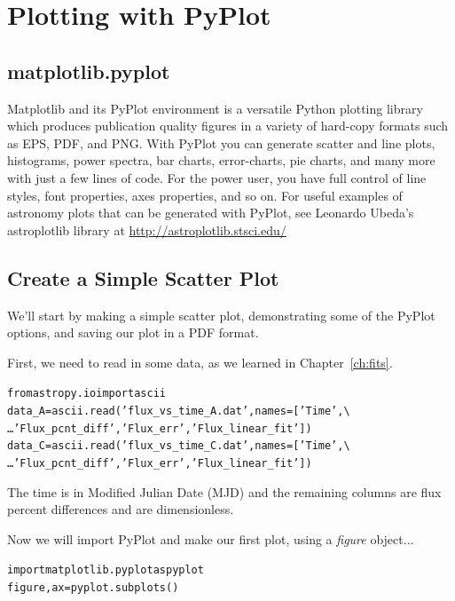 \chapter{Plotting with PyPlot}
\label{ch:pyplot}

\section{matplotlib.pyplot}
Matplotlib and its PyPlot environment is a versatile Python plotting
library which produces publication quality figures in a variety of
hard-copy formats such as EPS, PDF, and PNG.  With PyPlot you can
generate scatter and line plots, histograms, power spectra, bar
charts, error-charts, pie charts, and many more with just a few lines
of code. For the power user, you have full control of line styles,
font properties, axes properties, and so on. For useful examples of 
astronomy plots that can be generated with PyPlot, see Leonardo 
Ubeda's astroplotlib library at \href{http://astroplotlib.stsci.edu/}
{http://astroplotlib.stsci.edu/}


\section{Create a Simple Scatter Plot}

We'll start by making a simple scatter plot, demonstrating some of 
the PyPlot options, and saving our plot in a PDF format. 

First, we need to read in some data, as we learned in Chapter~\ref{ch:fits}.

\begin{alltt}
\pytab from astropy.io import ascii
\pytab data_A = ascii.read('flux_vs_time_A.dat', names=['Time',  \textbackslash 
\ldots 'Flux_pcnt_diff', 'Flux_err', 'Flux_linear_fit'])
\pytab data_C = ascii.read('flux_vs_time_C.dat', names=['Time',  \textbackslash 
\ldots 'Flux_pcnt_diff', 'Flux_err', 'Flux_linear_fit'])
\end{alltt}

The time is in Modified Julian Date (MJD) and the remaining 
columns are flux percent differences and are dimensionless. 

Now we will import PyPlot and make our first plot, 
using a \textit{figure} object...

\begin{alltt}
\pytab import matplotlib.pyplot as pyplot
\pytab figure, ax = pyplot.subplots()
\end{alltt}

